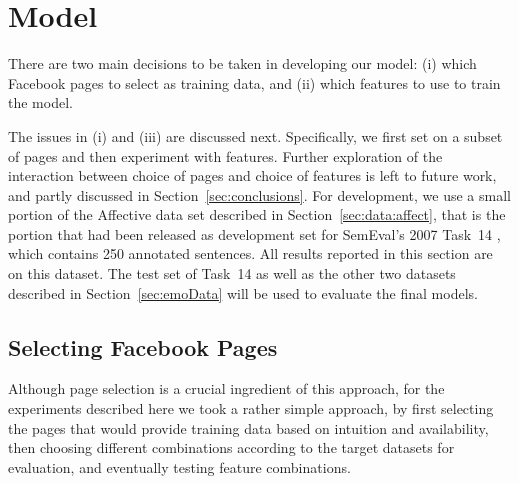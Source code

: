 \documentclass[11pt]{article}
\begin{document}




\section{Model}
\label{sec:model}


There are two main decisions to be taken in developing our model: (i) which Facebook pages to select as training data, and (ii) which features to use to train the model. 

  
  The issues in (i) and (iii) are discussed next. Specifically, we first set on a subset of pages and then experiment with features. Further exploration of the interaction between choice of pages and choice of features is left to future work, and partly discussed in Section~\ref{sec:conclusions}. For development, we use a small portion of the Affective data set described in Section~\ref{sec:data:affect}, that is the portion that had been released as development set for SemEval's 2007 Task~14 \cite{strapparava2007semeval}, which contains 250 annotated sentences. All results reported in this section are on this dataset.
  The test set of Task~14 as well as the other two datasets described in Section~\ref{sec:emoData} will be used to evaluate the final models.





\subsection{Selecting Facebook Pages}
\label{sec:selecting}

Although page selection is a crucial ingredient of this approach, for the experiments described here we took a rather simple approach, by first selecting the pages that would provide training data based on intuition and availability, then choosing different combinations according to the target datasets for evaluation, and eventually testing feature combinations. 
\end{document}
